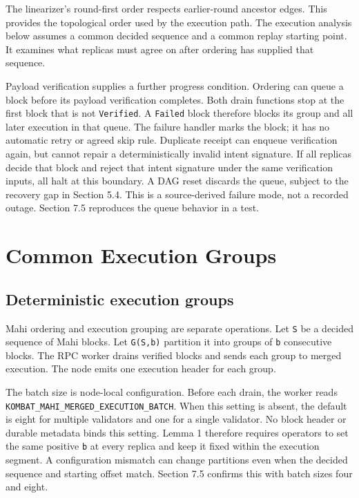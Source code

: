 \documentclass[11pt]{article}
\begin{document}
The linearizer's round-first order respects earlier-round ancestor edges. This provides the topological order used by the execution path. The execution analysis below assumes a common decided sequence and a common replay starting point. It examines what replicas must agree on after ordering has supplied that sequence.

Payload verification supplies a further progress condition. Ordering can queue a block before its payload verification completes. Both drain functions stop at the first block that is not \texttt{Verified}. A \texttt{Failed} block therefore blocks its group and all later execution in that queue. The failure handler marks the block; it has no automatic retry or agreed skip rule. Duplicate receipt can enqueue verification again, but cannot repair a deterministically invalid intent signature. If all replicas decide that block and reject that intent signature under the same verification inputs, all halt at this boundary. A DAG reset discards the queue, subject to the recovery gap in Section 5.4. This is a source-derived failure mode, not a recorded outage. Section 7.5 reproduces the queue behavior in a test. \cite{R29,R30}

\section{Common Execution Groups}
\subsection{Deterministic execution groups}
Mahi ordering and execution grouping are separate operations. Let \texttt{S} be a decided sequence of Mahi blocks. Let \texttt{G(S,b)} partition it into groups of \texttt{b} consecutive blocks. The RPC worker drains verified blocks and sends each group to merged execution. The node emits one execution header for each group. \cite{R12}

The batch size is node-local configuration. Before each drain, the worker reads \texttt{KOMBAT\_\allowbreak MAHI\_\allowbreak MERGED\_\allowbreak EXECUTION\_\allowbreak BATCH}. When this setting is absent, the default is eight for multiple validators and one for a single validator. No block header or durable metadata binds this setting. Lemma 1 therefore requires operators to set the same positive \texttt{b} at every replica and keep it fixed within the execution segment. A configuration mismatch can change partitions even when the decided sequence and starting offset match. Section 7.5 confirms this with batch sizes four and eight. \cite{R29,R30}
\end{document}
